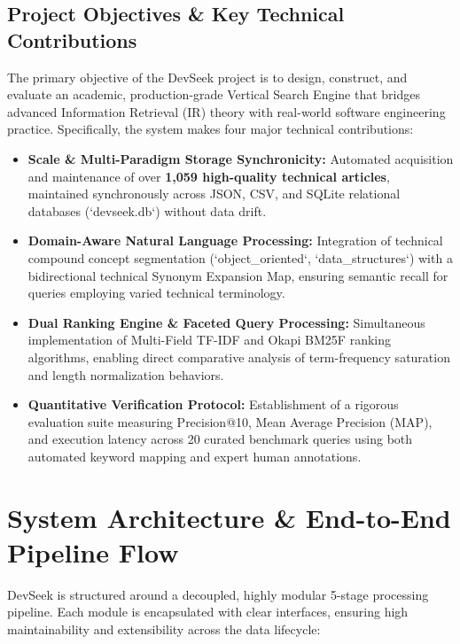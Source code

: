 \documentclass[12pt,a4paper]{article}
\begin{document}
\subsection{Project Objectives \& Key Technical Contributions}
The primary objective of the DevSeek project is to design, construct, and evaluate an academic, production-grade Vertical Search Engine that bridges advanced Information Retrieval (IR) theory with real-world software engineering practice. Specifically, the system makes four major technical contributions:
\begin{itemize}
    \item \textbf{Scale \& Multi-Paradigm Storage Synchronicity:} Automated acquisition and maintenance of over \textbf{1,059 high-quality technical articles}, maintained synchronously across JSON, CSV, and SQLite relational databases (`devseek.db`) without data drift.
    \item \textbf{Domain-Aware Natural Language Processing:} Integration of technical compound concept segmentation (`object\_oriented`, `data\_structures`) with a bidirectional technical Synonym Expansion Map, ensuring semantic recall for queries employing varied technical terminology.
    \item \textbf{Dual Ranking Engine \& Faceted Query Processing:} Simultaneous implementation of Multi-Field TF-IDF and Okapi BM25F ranking algorithms, enabling direct comparative analysis of term-frequency saturation and length normalization behaviors.
    \item \textbf{Quantitative Verification Protocol:} Establishment of a rigorous evaluation suite measuring Precision@10, Mean Average Precision (MAP), and execution latency across 20 curated benchmark queries using both automated keyword mapping and expert human annotations.
\end{itemize}

\section{System Architecture \& End-to-End Pipeline Flow}

DevSeek is structured around a decoupled, highly modular 5-stage processing pipeline. Each module is encapsulated with clear interfaces, ensuring high maintainability and extensibility across the data lifecycle:
\end{document}
